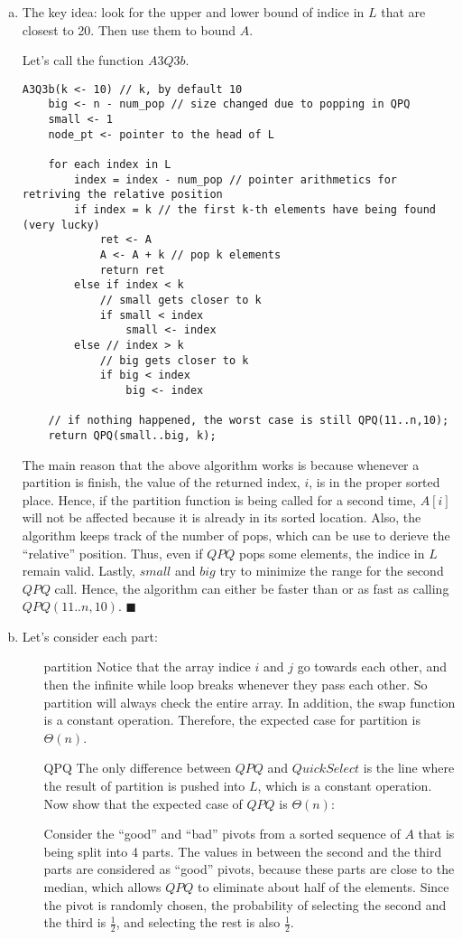 \documentclass[12pt]{article}
\begin{document}
\begin{enumerate}[(a)]
\item
The key idea: look for the upper and lower bound of indice in $L$ that are closest to 20. Then use them to bound $A$.

Let's call the function $A3Q3b$.
\begin{lstlisting}
A3Q3b(k <- 10) // k, by default 10
	big <- n - num_pop // size changed due to popping in QPQ
	small <- 1
	node_pt <- pointer to the head of L

	for each index in L
		index = index - num_pop // pointer arithmetics for retriving the relative position
		if index = k // the first k-th elements have being found (very lucky)
			ret <- A
			A <- A + k // pop k elements
			return ret
		else if index < k
			// small gets closer to k
			if small < index
				small <- index
		else // index > k
			// big gets closer to k
			if big < index
				big <- index

	// if nothing happened, the worst case is still QPQ(11..n,10);
	return QPQ(small..big, k);
\end{lstlisting}
The main reason that the above algorithm works is because whenever a partition is finish, the value of the returned index, $i$, is in the proper sorted place.
Hence, if the partition function is being called for a second time, $A[i]$ will not be affected because it is already in its sorted location. 
Also, the algorithm keeps track of the number of pops, which can be use to derieve the ``relative'' position.
Thus, even if $QPQ$ pops some elements, the indice in $L$ remain valid.
Lastly, $small$ and $big$ try to minimize the range for the second $QPQ$ call.
Hence, the algorithm can either be faster than or as fast as calling $QPQ(11..n,10)$.
\hfill $\blacksquare$

\item
Let's consider each part:
\begin{itemize}
\item[partition]
Notice that the array indice $i$ and $j$ go towards each other, and then the infinite while loop breaks whenever they pass each other.
So partition will always check the entire array.
In addition, the swap function is a constant operation. Therefore, the expected case for partition is $\Theta(n)$.
\item[QPQ]
The only difference between $QPQ$ and $QuickSelect$ is the line where the result of partition is pushed into $L$, which is a constant operation.
Now show that the expected case of $QPQ$ is $\Theta(n)$:

Consider the ``good'' and ``bad'' pivots from a sorted sequence of $A$ that is being split into 4 parts.
The values in between the second and the third parts are considered as ``good'' pivots, because these parts are close to the median, which allows $QPQ$ to eliminate about half of the elements.
Since the pivot is randomly chosen, the probability of selecting the second and the third is $\frac{1}{2}$, and selecting the rest is also $\frac{1}{2}$.


\end{itemize}
\end{enumerate}
\end{document}
